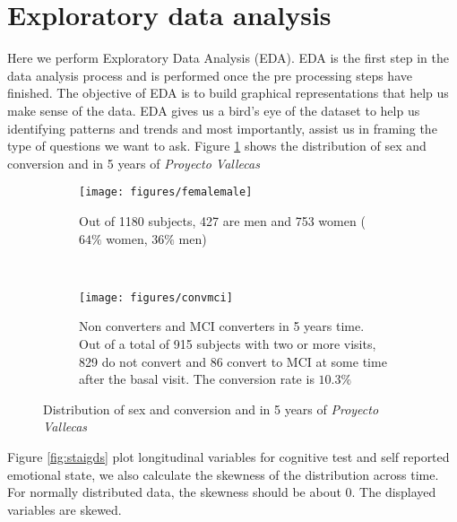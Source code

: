 \documentclass[11pt]{article}
\begin{document}
\section{Exploratory data analysis}
\label{se:eda}
Here we perform Exploratory Data Analysis (EDA). EDA is the first step in the data analysis process and is performed once the pre processing steps have finished. 
The objective of EDA is to build graphical representations that help us make sense of the data. EDA gives us a bird's eye of the dataset to help us identifying patterns and trends and most importantly, assist us in framing the type of  questions we want to ask.
Figure \ref{fig:sexmci} shows the distribution of sex and conversion and in 5 years of \emph{Proyecto Vallecas}

\begin{figure}[t!]
    \centering
    \begin{subfigure}[t]{0.49\textwidth}
        \centering
        \texttt{[image: figures/femalemale]}
        \caption{Out of 1180 subjects, 427 are men and 753 women ($64\%$ women, $36\%$ men)}
    \end{subfigure}
    ~ 
    \begin{subfigure}[t]{0.49\textwidth}
        \centering
        \texttt{[image: figures/convmci]}
        \caption{Non converters and MCI converters in 5 years time. Out of a total of 915 subjects with two or more visits, 829 do not convert and 86 convert to MCI at some time after the basal visit. The conversion rate is $10.3\%$}
    \end{subfigure}%
    \label{fig:sexmci}
    \caption{Distribution of sex and conversion and in 5 years of \emph{Proyecto Vallecas}}
\end{figure}

Figure \ref{fig:staigds} plot longitudinal variables for cognitive test and self reported emotional state, we also calculate the skewness of the distribution across time. For normally distributed data, the skewness should be about 0. The displayed variables are skewed.
\end{document}
